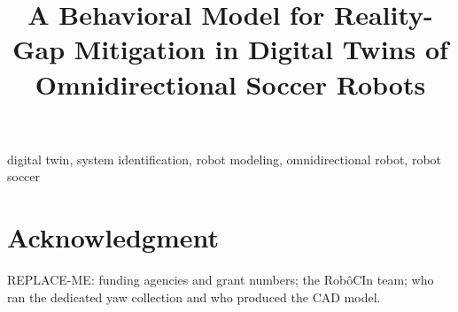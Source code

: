 \documentclass[conference,a4paper]{IEEEtran}
\begin{document}
\title{A Behavioral Model for Reality-Gap Mitigation in Digital Twins of Omnidirectional Soccer Robots}

\author{
}


\maketitle



\begin{IEEEkeywords}
digital twin, system identification, robot modeling, omnidirectional robot, robot soccer
\end{IEEEkeywords}








\section*{Acknowledgment}
REPLACE-ME: funding agencies and grant numbers; the Rob\^{o}CIn team; who ran the
dedicated yaw collection and who produced the CAD model.



\end{document}
